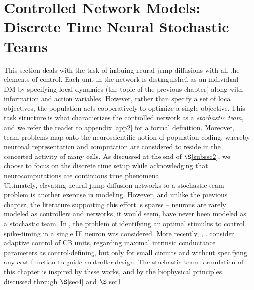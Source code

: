 \documentclass[12pt, oneside]{report}
\newcommand{\1}[1]{\mathbbm{1}_{\{#1\}}}
\theoremstyle{definition}
\begin{document}
\chapter{Controlled Network Models: Discrete Time Neural Stochastic Teams}
This section deals with the task of imbuing neural jump-diffusions with all the elements of control.
Each unit in the network is distinguished as an individual DM by specifying local dynamics (the topic of the previous chapter) along with information and action variables.
However, rather than specify a set of local objectives, the population acts cooperatively to optimize a single objective. This task structure is what characterizes the controlled network as a
\textit{stochastic team}, and we refer the reader to appendix \ref{app2} for a formal definition. Moreover, team problems map onto the
neuroscientific notion of population coding, whereby neuronal representation and computation are considered to reside in the concerted activity of many cells.
As discussed at the end of $\S$\ref{subsec2}, we choose to focus on the discrete time setup while acknowledging that neurocomputations are continuous time phenomena.\\[5pt]
\indent Ultimately, elevating neural jump-diffusion networks to a stochastic team problem is another exercise in modeling. However, and unlike the previous chapter,
the literature supporting this effort is sparse -- neurons are rarely modeled as controllers and networks, it would seem, have never been modeled as a stochastic team.
In \cite{Ahmadian_Packer_Yuste_Paninski_2011}, \cite{Iolov_Ditlevsen_Longtin_2014} the problem of identifying an optimal stimulus to control spike-timing in a single IF neuron was considered. More recently,
\cite{Sepulchre_2022}, \cite{Schmetterling_Burghi_Sepulchre_2022}, \cite{Burghi_Sepulchre_2023} consider adaptive control of CB units, regarding maximal intrinsic conductance parameters as control-defining, but
only for small circuits and without specifying any cost function to guide controller design. The stochastic team formulation of this chapter is inspired by these works, and by the biophysical principles discussed through $\S$\ref{sec4} and $\S$\ref{sec1}.
\end{document}
